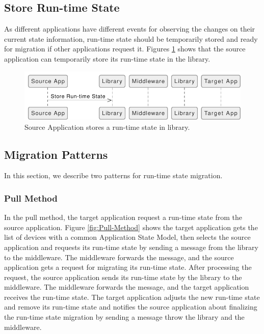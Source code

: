 \subsection{Store Run-time State}
As different applications have different events for observing the changes on their current state information, run-time state should be temporarily stored and ready for migration if other applications request it. Figures \ref{fig:Store-Current-State-Source} shows that the source application can temporarily store its run-time state in the library.

\FloatBarrier \begin{figure}[H]
    \includegraphics[width=\linewidth]{../figures/Store-Current-State-Source.pdf}
    \centering
    \caption{Source Application stores a run-time state in library.}
    \label{fig:Store-Current-State-Source}
\end{figure} \FloatBarrier


\subsection{Migration Patterns}
In this section, we describe two patterns for run-time state migration.

\subsubsection{Pull Method}
In the pull method, the target application request a run-time state from the source application. Figure \ref{fig:Pull-Method} shows the target application gets the list of devices with a common Application State Model, then selects the source application and requests its run-time state by sending a message from the library to the middleware. The middleware forwards the message, and the source application gets a request for migrating its run-time state. After processing the request, the source application sends its run-time state by the library to the middleware. The middleware forwards the message, and the target application receives the run-time state. The target application adjusts the new run-time state and remove its run-time state and notifies the source application about finalizing the run-time state migration by sending a message throw the library and the middleware. 

